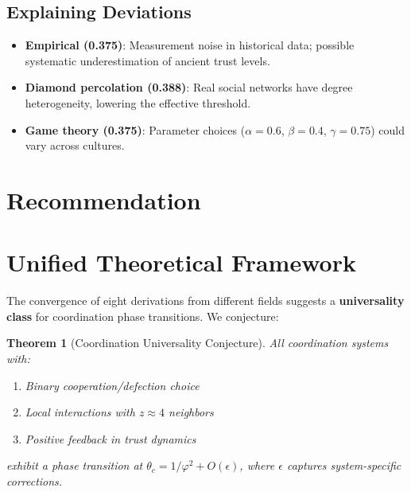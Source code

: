 \documentclass[11pt]{article}
\newtheorem{theorem}{Theorem}
\begin{document}
\subsection{Explaining Deviations}

\begin{itemize}
\item \textbf{Empirical (0.375)}: Measurement noise in historical data; possible systematic underestimation of ancient trust levels.

\item \textbf{Diamond percolation (0.388)}: Real social networks have degree heterogeneity, lowering the effective threshold.

\item \textbf{Game theory (0.375)}: Parameter choices ($\alpha = 0.6$, $\beta = 0.4$, $\gamma = 0.75$) could vary across cultures.
\end{itemize}

\section{Recommendation}

\begin{center}
\end{center}

\section{Unified Theoretical Framework}

The convergence of eight derivations from different fields suggests a \textbf{universality class} for coordination phase transitions. We conjecture:

\begin{theorem}[Coordination Universality Conjecture]
All coordination systems with:
\begin{enumerate}
\item Binary cooperation/defection choice
\item Local interactions with $z \approx 4$ neighbors
\item Positive feedback in trust dynamics
\end{enumerate}
exhibit a phase transition at $\theta_c = 1/\varphi^2 + O(\epsilon)$, where $\epsilon$ captures system-specific corrections.
\end{theorem}
\end{document}
